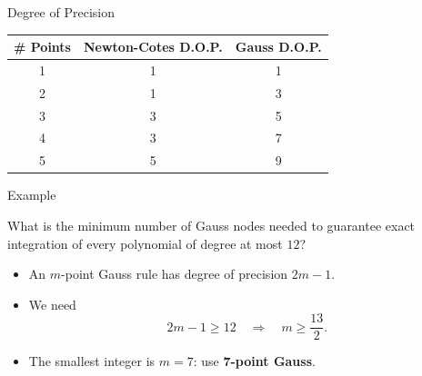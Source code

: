 \documentclass[10pt]{beamer}
\begin{document}


\begin{frame}{Degree of Precision}

\begin{center}
\begin{tabular}{c|c|c}
\textbf{\# Points} & \textbf{Newton-Cotes D.O.P.} & \textbf{Gauss D.O.P.} \\
\hline
1 & 1 & 1 \\
2 & 1 & 3 \\
3 & 3 & 5 \\
4 & 3 & 7 \\
5 & 5 & 9 \\
\end{tabular}
\end{center}

\vspace{5pt}


\end{frame}

\begin{frame}{Example}
\begin{example}
What is the minimum number of Gauss nodes needed to guarantee exact
integration of every polynomial of degree at most $12$?
\end{example}
\begin{itemize}
    \item An $m$-point Gauss rule has degree of precision $2m-1$.
    \item We need
    \[
        2m-1\ge 12 \quad\Longrightarrow\quad m\ge \frac{13}{2}.
    \]
    \item The smallest integer is $m=7$: use \textbf{7-point Gauss}.
\end{itemize}
\end{frame}
\end{document}
